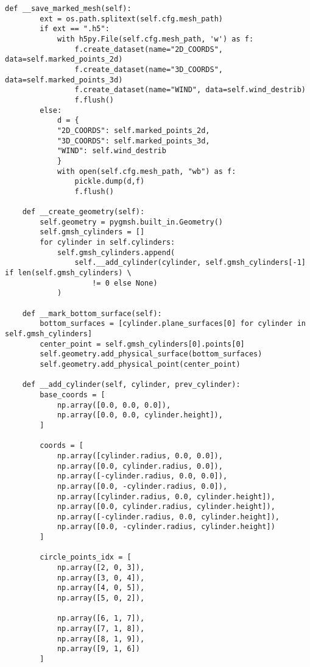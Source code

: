 \begin{lstlisting}[caption=Исходный код модуля генерации расчетной сетки и её маркировки, 
                    label={lst_meshgen_all}, basicstyle=\scriptsize]
    def __save_marked_mesh(self):
        ext = os.path.splitext(self.cfg.mesh_path)
        if ext == ".h5":
            with h5py.File(self.cfg.mesh_path, 'w') as f:
                f.create_dataset(name="2D_COORDS", data=self.marked_points_2d)
                f.create_dataset(name="3D_COORDS", data=self.marked_points_3d)
                f.create_dataset(name="WIND", data=self.wind_destrib)
                f.flush()
        else:
            d = {
            "2D_COORDS": self.marked_points_2d,
            "3D_COORDS": self.marked_points_3d,
            "WIND": self.wind_destrib
            }
            with open(self.cfg.mesh_path, "wb") as f:
                pickle.dump(d,f)
                f.flush()

    def __create_geometry(self):
        self.geometry = pygmsh.built_in.Geometry()
        self.gmsh_cylinders = []
        for cylinder in self.cylinders:
            self.gmsh_cylinders.append(
                self.__add_cylinder(cylinder, self.gmsh_cylinders[-1] if len(self.gmsh_cylinders) \ 
                    != 0 else None)
            )

    def __mark_bottom_surface(self):
        bottom_surfaces = [cylinder.plane_surfaces[0] for cylinder in self.gmsh_cylinders]
        center_point = self.gmsh_cylinders[0].points[0]
        self.geometry.add_physical_surface(bottom_surfaces)
        self.geometry.add_physical_point(center_point)

    def __add_cylinder(self, cylinder, prev_cylinder):
        base_coords = [
            np.array([0.0, 0.0, 0.0]),
            np.array([0.0, 0.0, cylinder.height]),
        ]

        coords = [
            np.array([cylinder.radius, 0.0, 0.0]),
            np.array([0.0, cylinder.radius, 0.0]),
            np.array([-cylinder.radius, 0.0, 0.0]),
            np.array([0.0, -cylinder.radius, 0.0]),
            np.array([cylinder.radius, 0.0, cylinder.height]),
            np.array([0.0, cylinder.radius, cylinder.height]),
            np.array([-cylinder.radius, 0.0, cylinder.height]),
            np.array([0.0, -cylinder.radius, cylinder.height])
        ]

        circle_points_idx = [
            np.array([2, 0, 3]),
            np.array([3, 0, 4]),
            np.array([4, 0, 5]),
            np.array([5, 0, 2]),

            np.array([6, 1, 7]),
            np.array([7, 1, 8]),
            np.array([8, 1, 9]),
            np.array([9, 1, 6])
        ]


\end{lstlisting}
